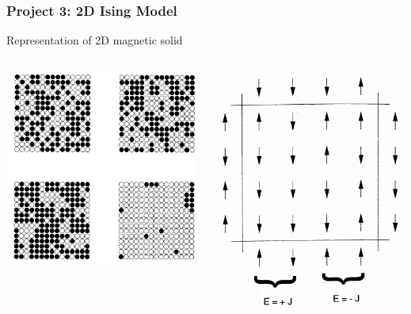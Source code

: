 \documentclass{beamer}
\begin{document}
\frame
{
    \frametitle{Project 3: 2D Ising Model}

    \begin{center}
        Representation of 2D magnetic solid
    \end{center}

    \bigskip

    \begin{columns}[c]


            \centering
        
            \includegraphics[width=0.9\linewidth]{temperatures.jpg}



            \centering

            \includegraphics[width=0.8\linewidth]{lattice.jpg}


\end{columns}}
\end{document}
